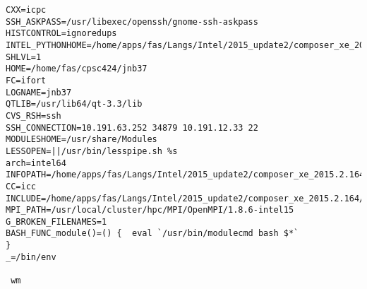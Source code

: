 \documentclass[11pt]{article}
\begin{document}
\begin{verbatim}
CXX=icpc
SSH_ASKPASS=/usr/libexec/openssh/gnome-ssh-askpass
HISTCONTROL=ignoredups
INTEL_PYTHONHOME=/home/apps/fas/Langs/Intel/2015_update2/composer_xe_2015.2.164/debugger/python/intel64/
SHLVL=1
HOME=/home/fas/cpsc424/jnb37
FC=ifort
LOGNAME=jnb37
QTLIB=/usr/lib64/qt-3.3/lib
CVS_RSH=ssh
SSH_CONNECTION=10.191.63.252 34879 10.191.12.33 22
MODULESHOME=/usr/share/Modules
LESSOPEN=||/usr/bin/lesspipe.sh %s
arch=intel64
INFOPATH=/home/apps/fas/Langs/Intel/2015_update2/composer_xe_2015.2.164/debugger/gdb/intel64/share/info/:/home/apps/fas/Langs/Intel/2015_update2/composer_xe_2015.2.164/debugger/gdb/intel64_mic/share/info/
CC=icc
INCLUDE=/home/apps/fas/Langs/Intel/2015_update2/composer_xe_2015.2.164/mkl/include
MPI_PATH=/usr/local/cluster/hpc/MPI/OpenMPI/1.8.6-intel15
G_BROKEN_FILENAMES=1
BASH_FUNC_module()=() {  eval `/usr/bin/modulecmd bash $*`
}
_=/bin/env

 wm
\end{verbatim}
\end{document}
